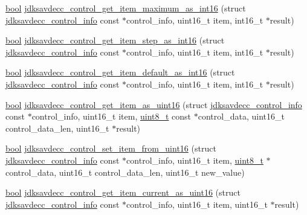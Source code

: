 \begin{DoxyCompactItemize}
\item 
\hyperlink{avb__gptp_8h_af6a258d8f3ee5206d682d799316314b1}{bool} \hyperlink{group__aem__control__value__helpers_ga6a3d41c037a968f4a830d9f4232db8e0}{jdksavdecc\+\_\+control\+\_\+get\+\_\+item\+\_\+maximum\+\_\+as\+\_\+int16} (struct \hyperlink{structjdksavdecc__control__info}{jdksavdecc\+\_\+control\+\_\+info} const $\ast$control\+\_\+info, uint16\+\_\+t item, int16\+\_\+t $\ast$result)
\item 
\hyperlink{avb__gptp_8h_af6a258d8f3ee5206d682d799316314b1}{bool} \hyperlink{group__aem__control__value__helpers_ga975e49ff71e57f568e7f86728fa6864f}{jdksavdecc\+\_\+control\+\_\+get\+\_\+item\+\_\+step\+\_\+as\+\_\+int16} (struct \hyperlink{structjdksavdecc__control__info}{jdksavdecc\+\_\+control\+\_\+info} const $\ast$control\+\_\+info, uint16\+\_\+t item, int16\+\_\+t $\ast$result)
\item 
\hyperlink{avb__gptp_8h_af6a258d8f3ee5206d682d799316314b1}{bool} \hyperlink{group__aem__control__value__helpers_gaa6803a15e22bb6a14438a477b6bfb5dc}{jdksavdecc\+\_\+control\+\_\+get\+\_\+item\+\_\+default\+\_\+as\+\_\+int16} (struct \hyperlink{structjdksavdecc__control__info}{jdksavdecc\+\_\+control\+\_\+info} const $\ast$control\+\_\+info, uint16\+\_\+t item, int16\+\_\+t $\ast$result)
\item 
\hyperlink{avb__gptp_8h_af6a258d8f3ee5206d682d799316314b1}{bool} \hyperlink{group__aem__control__value__helpers_ga989c4b4ff82dcd56afcbee7c073a9eb1}{jdksavdecc\+\_\+control\+\_\+get\+\_\+item\+\_\+as\+\_\+uint16} (struct \hyperlink{structjdksavdecc__control__info}{jdksavdecc\+\_\+control\+\_\+info} const $\ast$control\+\_\+info, uint16\+\_\+t item, \hyperlink{stdint_8h_aba7bc1797add20fe3efdf37ced1182c5}{uint8\+\_\+t} const $\ast$control\+\_\+data, uint16\+\_\+t control\+\_\+data\+\_\+len, uint16\+\_\+t $\ast$result)
\item 
\hyperlink{avb__gptp_8h_af6a258d8f3ee5206d682d799316314b1}{bool} \hyperlink{group__aem__control__value__helpers_ga10928f5471d1ba38fa6ea945f0144d3a}{jdksavdecc\+\_\+control\+\_\+set\+\_\+item\+\_\+from\+\_\+uint16} (struct \hyperlink{structjdksavdecc__control__info}{jdksavdecc\+\_\+control\+\_\+info} const $\ast$control\+\_\+info, uint16\+\_\+t item, \hyperlink{stdint_8h_aba7bc1797add20fe3efdf37ced1182c5}{uint8\+\_\+t} $\ast$control\+\_\+data, uint16\+\_\+t control\+\_\+data\+\_\+len, uint16\+\_\+t new\+\_\+value)
\item 
\hyperlink{avb__gptp_8h_af6a258d8f3ee5206d682d799316314b1}{bool} \hyperlink{group__aem__control__value__helpers_ga9ccbfdee1d50a09f327c84de2229aead}{jdksavdecc\+\_\+control\+\_\+get\+\_\+item\+\_\+current\+\_\+as\+\_\+uint16} (struct \hyperlink{structjdksavdecc__control__info}{jdksavdecc\+\_\+control\+\_\+info} const $\ast$control\+\_\+info, uint16\+\_\+t item, uint16\+\_\+t $\ast$result)

\end{DoxyCompactItemize}
